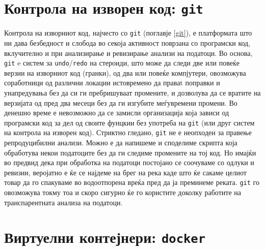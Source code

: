 \documentclass[
]{book}
\begin{document}
\hypertarget{ux43aux43eux43dux442ux440ux43eux43bux430-ux43dux430-ux438ux437ux432ux43eux440ux435ux43d-ux43aux43eux434-git}{%
\section{\texorpdfstring{Контрола на изворен код: \texttt{git}}{Контрола на изворен код: git}}\label{ux43aux43eux43dux442ux440ux43eux43bux430-ux43dux430-ux438ux437ux432ux43eux440ux435ux43d-ux43aux43eux434-git}}

Контрола на изворниот код, најчесто со \texttt{git} (поглавје \ref{git}), е платформата што ни дава безбедност и слобода во секоја активност поврзана со програмски код, вклучително и при анализирање и ревизирање анализи на податоци. Во основа, \texttt{git} e систем за \texttt{undo}/\texttt{redo} на стероиди, што може да следи две или повеќе верзии на изворниот код (гранки), од два или повеќе компјутери, овозможува соработници од различни локации истовремено да праваt поправки и унапредувања без да си ги пребришуваат промените, и дозволува да се вратите на верзијата од пред два месеци без да ги изгубите меѓувремени промени. Во денешно време е невозможно да се замисли организација која зависи од програмски код за дел од своите фунцкии без употреба на \texttt{git} (или друг систем на контрола на изворен код). Стриктно гледано, \texttt{git} не е неопходен за правење репродуцибилни анализи. Можно е да напишеме и споделиме скрипта која обработува некои податоците без да ги следиме промените на тој код. Но имајќи во предвид дека при обработка на податоци постојано се соочуваме со одлуки и ревизии, веројатно е ќе се најдеме на брег на река каде што ќе сакаме целиот товар да го спакуваме во водоотпорена вреќа пред да ја преминеме реката. \texttt{git} го овозможува токму тоа и скоро сигурно ќе го користите доколку работите на транспарентната анализа на податоци.

\hypertarget{ux432ux438ux440ux442ux443ux435ux43bux43dux438-ux43aux43eux43dux442ux435ux458ux43dux435ux440ux438-docker}{%
\section{\texorpdfstring{Виртуелни контејнери: \texttt{docker}}{Виртуелни контејнери: docker}}\label{ux432ux438ux440ux442ux443ux435ux43bux43dux438-ux43aux43eux43dux442ux435ux458ux43dux435ux440ux438-docker}}
\end{document}
